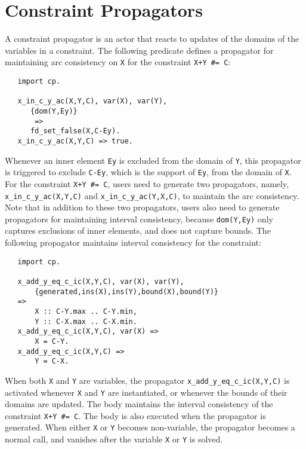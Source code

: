 \section{Constraint Propagators}
A constraint propagator is an actor that reacts to updates of the domains of the variables in a constraint. The following predicate defines a propagator for maintaining arc consistency on \texttt{X} for the constraint \verb-X+Y #= C-:
\begin{verbatim}
   import cp.

   x_in_c_y_ac(X,Y,C), var(X), var(Y),
      {dom(Y,Ey)}
       =>         
      fd_set_false(X,C-Ey).
   x_in_c_y_ac(X,Y,C) => true.
\end{verbatim}
Whenever an inner element \texttt{Ey} is excluded from the domain of \texttt{Y}, this propagator is triggered to exclude \texttt{C-Ey}, which is the support of \texttt{Ey}, from the domain of \texttt{X}. For the constraint \verb-X+Y #= C-, users need to generate two propagators, namely, \texttt{x\_in\_c\_y\_ac(X,Y,C)} and \texttt{x\_in\_c\_y\_ac(Y,X,C)}, to maintain the arc consistency. Note that in addition to these two propagators, users also need to generate propagators for maintaining interval consistency, because \texttt{dom(Y,Ey)} only captures exclusions of inner elements, and does not capture bounds. The following propagator maintains interval consistency for the constraint:
\begin{verbatim}
   import cp.

   x_add_y_eq_c_ic(X,Y,C), var(X), var(Y),
       {generated,ins(X),ins(Y),bound(X),bound(Y)}
   =>         
       X :: C-Y.max .. C-Y.min,
       Y :: C-X.max .. C-X.min.
   x_add_y_eq_c_ic(X,Y,C), var(X) =>
       X = C-Y.
   x_add_y_eq_c_ic(X,Y,C) =>
       Y = C-X.
\end{verbatim}
When both \texttt{X} and \texttt{Y} are variables, the propagator \texttt{x\_add\_y\_eq\_c\_ic(X,Y,C)} is activated whenever \texttt{X} and \texttt{Y} are instantiated, or whenever the bounds of their domains are updated. The body maintains the interval consistency of the constraint \verb-X+Y #= C-. The body is also executed when the propagator is generated. When either \texttt{X} or \texttt{Y} becomes non-variable, the propagator becomes a normal call, and vanishes after the variable \texttt{X} or \texttt{Y} is solved.

